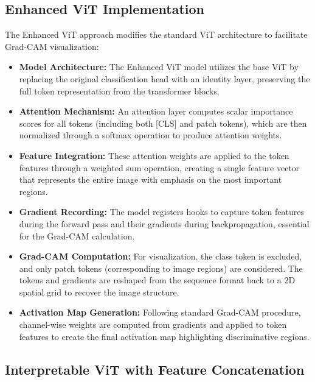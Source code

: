 \documentclass[a4paper,12pt]{report}
\begin{document}
\subsection{Enhanced ViT Implementation}

The Enhanced ViT approach modifies the standard ViT architecture to facilitate Grad-CAM visualization:

\begin{itemize}
\item \textbf{Model Architecture:} The Enhanced ViT model utilizes the base ViT by replacing the original classification head with an identity layer, preserving the full token representation from the transformer blocks.

\item \textbf{Attention Mechanism:} An attention layer computes scalar importance scores for all tokens (including both [CLS] and patch tokens), which are then normalized through a softmax operation to produce attention weights.

\item \textbf{Feature Integration:} These attention weights are applied to the token features through a weighted sum operation, creating a single feature vector that represents the entire image with emphasis on the most important regions.

\item \textbf{Gradient Recording:} The model registers hooks to capture token features during the forward pass and their gradients during backpropagation, essential for the Grad-CAM calculation.

\item \textbf{Grad-CAM Computation:} For visualization, the class token is excluded, and only patch tokens (corresponding to image regions) are considered. The tokens and gradients are reshaped from the sequence format back to a 2D spatial grid to recover the image structure.

\item \textbf{Activation Map Generation:} Following standard Grad-CAM procedure, channel-wise weights are computed from gradients and applied to token features to create the final activation map highlighting discriminative regions.
\end{itemize}

\subsection{Interpretable ViT with Feature Concatenation}
\end{document}
